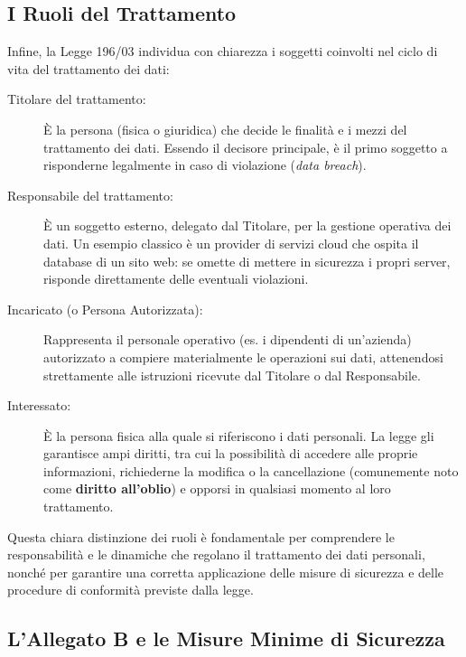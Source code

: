 \subsection*{I Ruoli del Trattamento}

Infine, la Legge 196/03 individua con chiarezza i soggetti coinvolti nel ciclo di vita del trattamento dei dati:

\begin{description}
    \item[Titolare del trattamento:] È la persona (fisica o giuridica) che decide le finalità e i mezzi del trattamento dei dati.
    Essendo il decisore principale, è il primo soggetto a risponderne legalmente in caso di violazione (\textit{data breach}).
    \item[Responsabile del trattamento:] È un soggetto esterno, delegato dal Titolare, per la gestione operativa dei dati.
    Un esempio classico è un provider di servizi cloud che ospita il database di un sito web: se omette di mettere in sicurezza i propri server, risponde direttamente delle eventuali violazioni.
    \item[Incaricato (o Persona Autorizzata):] Rappresenta il personale operativo (es. i dipendenti di un'azienda) autorizzato a compiere materialmente le operazioni sui dati, attenendosi strettamente alle istruzioni ricevute dal Titolare o dal Responsabile.
    \item[Interessato:] È la persona fisica alla quale si riferiscono i dati personali.
    La legge gli garantisce ampi diritti, tra cui la possibilità di accedere alle proprie informazioni, richiederne la modifica o la cancellazione (comunemente noto come \textbf{diritto all'oblio}) e opporsi in qualsiasi momento al loro trattamento.
\end{description}

Questa chiara distinzione dei ruoli è fondamentale per comprendere le responsabilità e le dinamiche che regolano il trattamento dei dati personali, nonché per garantire una corretta applicazione delle misure di sicurezza e delle procedure di conformità previste dalla legge.
\subsection{L'Allegato B e le Misure Minime di Sicurezza}

